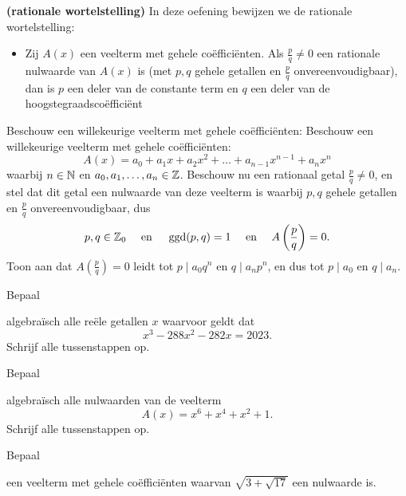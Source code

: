 \documentclass{ximera}
\begin{document}
\begin{Uitbreiding}
\begin{exercise} 
{\bf (rationale wortelstelling)} 
In deze oefening bewijzen we de rationale wortelstelling:
\begin{itemize}
\item[]
Zij $A(x)$ een veelterm met gehele co\"effici\"enten. Als $\frac{p}{q} \neq 0$ een rationale nulwaarde van $A(x)$ is (met $p,q$ gehele getallen en $\frac{p}{q}$ onvereenvoudigbaar), dan is $p$ een deler van de constante term en $q$ een deler van de hoogstegraadsco\"effici\"ent  
\end{itemize}
Beschouw een willekeurige veelterm met gehele co\"effici\"enten:
Beschouw een willekeurige veelterm met gehele co\"effici\"enten:
\[
A(x) = a_0 + a_1 x + a_2 x^2 + \dots + a_{n-1} x^{n-1} + a_nx^n
\]
waarbij $ n \in \mathbb{N}$ en $a_0, a_1, \ldots, a_n \in \mathbb{Z}$. Beschouw nu een rationaal getal $\frac{p}{q} \neq 0$, en stel dat dit getal een nulwaarde van deze veelterm is waarbij $p,q$ gehele getallen en $\frac{p}{q}$ onvereenvoudigbaar, dus
\[
p,q \in \mathbb{Z}_0 \quad \text{ en } \quad \operatorname{ggd}(p,q)=1 \quad \text{ en } \quad A\left(\frac{p}{q}\right) = 0.
\]
Toon aan dat $A\left(\frac{p}{q}\right) = 0$ leidt tot $p \mid a_0q^n$ en $q \mid a_n p^n$, en dus tot $p \mid a_0$ en $q \mid a_n$.
\end{exercise} 
\end{Uitbreiding}

\begin{exercise} 
\hypertarget{oef4.17}{Bepaal} algebra\"isch alle re\"ele getallen $x$ waarvoor geldt dat 
\[
x^3-288x^2-282x  = 2023.
\]
Schrijf alle tussenstappen op.
\end{exercise} 

\begin{exercise} 
\hypertarget{oef4.18}{Bepaal} algebra\"isch alle nulwaarden van de veelterm
\[
A(x) = x^6 + x^4 + x^2 + 1.
\]
Schrijf alle tussenstappen op.
\end{exercise} 

\begin{exercise} 
\hypertarget{oef4.19}{Bepaal} een veelterm met gehele co\"effici\"enten waarvan $\sqrt{3+\sqrt{17}}$ een nulwaarde is.
\end{exercise} 
\end{document}
